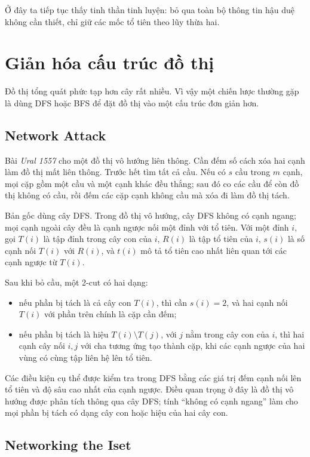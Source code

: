 \documentclass[11pt]{article}
\begin{document}
Ở đây ta tiếp tục thấy tinh thần tinh luyện: bỏ qua toàn bộ thông tin hậu duệ
không cần thiết, chỉ giữ các mốc tổ tiên theo lũy thừa hai.

\section{Giản hóa cấu trúc đồ thị}

Đồ thị tổng quát phức tạp hơn cây rất nhiều. Vì vậy một chiến lược thường gặp
là dùng DFS hoặc BFS để đặt đồ thị vào một cấu trúc đơn giản hơn.

\subsection{Network Attack}

Bài \textit{Ural 1557} cho một đồ thị vô hướng liên thông. Cần đếm số cách
xóa hai cạnh làm đồ thị mất liên thông. Trước hết tìm tất cả cầu. Nếu có
\(s\) cầu trong \(m\) cạnh, mọi cặp gồm một cầu và một cạnh khác đều thắng;
sau đó co các cầu để còn đồ thị không có cầu, rồi đếm các cặp cạnh không cầu
mà xóa đi làm đồ thị tách.

Bản gốc dùng cây DFS. Trong đồ thị vô hướng, cây DFS không có cạnh ngang; mọi
cạnh ngoài cây đều là cạnh ngược nối một đỉnh với tổ tiên. Với một đỉnh \(i\),
gọi \(T(i)\) là tập đỉnh trong cây con của \(i\), \(R(i)\) là tập tổ tiên của
\(i\), \(s(i)\) là số cạnh nối \(T(i)\) với \(R(i)\), và \(t(i)\) mô tả tổ
tiên cao nhất liên quan tới các cạnh ngược từ \(T(i)\).

Sau khi bỏ cầu, một 2-cut có hai dạng:
\begin{itemize}
  \item nếu phần bị tách là cả cây con \(T(i)\), thì cần \(s(i)=2\), và hai
  cạnh nối \(T(i)\) với phần trên chính là cặp cần đếm;
  \item nếu phần bị tách là hiệu \(T(i)\setminus T(j)\), với \(j\) nằm trong
  cây con của \(i\), thì hai cạnh cây nối \(i,j\) với cha tương ứng tạo thành
  cặp, khi các cạnh ngược của hai vùng có cùng tập liên hệ lên tổ tiên.
\end{itemize}

Các điều kiện cụ thể được kiểm tra trong DFS bằng các giá trị đếm cạnh nối lên
tổ tiên và độ sâu cao nhất của cạnh ngược. Điều quan trọng ở đây là đồ thị vô
hướng được phân tích thông qua cây DFS; tính ``không có cạnh ngang'' làm cho
mọi phần bị tách có dạng cây con hoặc hiệu của hai cây con.

\subsection{Networking the Iset}
\end{document}
